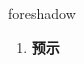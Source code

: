 
\begin{frame}
{\huge foreshadow}
\begin{center}
\begin{enumerate}\Large
  \item \textbf{预示}
\end{enumerate}
\end{center}
\end{frame}
